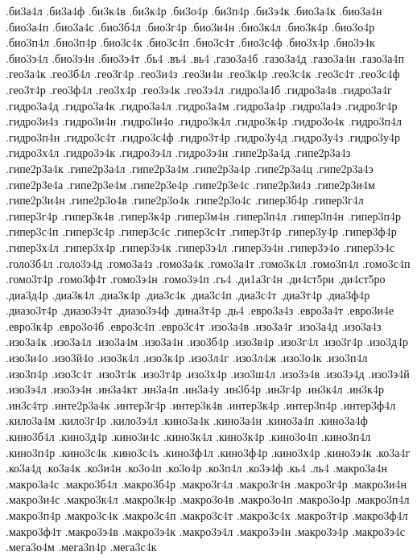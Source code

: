 {.би3а4л
.би3а4ф
.би3к4в
.би3к4р
.би3о4р
.би3п4р
.би3э4к
.био3а4к
.био3а4н
.био3а4п
.био3а4с
.био3б4л
.био3г4р
.био3и4н
.био3к4л
.био3к4р
.био3о4р
.био3п4л
.био3п4р
.био3с4к
.био3с4п
.био3с4т
.био3с4ф
.био3х4р
.био3э4к
.био3э4л
.био3э4н
.био3э4т
.бь4
.въ4
.вь4
.газо3а4б
.газо3а4д
.газо3а4н
.газо3а4п
.гео3а4к
.гео3б4л
.гео3г4р
.гео3и4з
.гео3и4н
.гео3к4р
.гео3с4к
.гео3с4т
.гео3с4ф
.гео3т4р
.гео3ф4л
.гео3х4р
.гео3э4к
.гео3э4л
.гидро3а4б
.гидро3а4в
.гидро3а4г
.гидро3а4д
.гидро3а4к
.гидро3а4л
.гидро3а4м
.гидро3а4р
.гидро3а4э
.гидро3г4р
.гидро3и4з
.гидро3и4н
.гидро3и4о
.гидро3к4л
.гидро3к4р
.гидро3о4к
.гидро3п4л
.гидро3п4н
.гидро3с4т
.гидро3с4ф
.гидро3т4р
.гидро3у4д
.гидро3у4з
.гидро3у4р
.гидро3х4л
.гидро3э4к
.гидро3э4л
.гидро3э4н
.гипе2р3а4д
.гипе2р3а4з
.гипе2р3а4к
.гипе2р3а4л
.гипе2р3а4м
.гипе2р3а4р
.гипе2р3а4ц
.гипе2р3а4э
.гипе2р3е4а
.гипе2р3е4м
.гипе2р3е4р
.гипе2р3е4с
.гипе2р3и4з
.гипе2р3и4м
.гипе2р3и4н
.гипе2р3о4в
.гипе2р3о4к
.гипе2р3о4с
.гипер3б4р
.гипер3г4л
.гипер3г4р
.гипер3к4в
.гипер3к4р
.гипер3м4н
.гипер3п4л
.гипер3п4н
.гипер3п4р
.гипер3с4п
.гипер3с4р
.гипер3с4с
.гипер3с4т
.гипер3т4р
.гипер3у4р
.гипер3ф4р
.гипер3х4л
.гипер3х4р
.гипер3э4к
.гипер3э4л
.гипер3э4н
.гипер3э4о
.гипер3э4с
.голо3б4л
.голо3э4д
.гомо3а4з
.гомо3а4к
.гомо3а4т
.гомо3к4л
.гомо3п4л
.гомо3с4п
.гомо3т4р
.гомо3ф4т
.гомо3э4н
.гомо3э4п
.гь4
.ди1а3г4н
.ди4ст5ри
.ди4ст5ро
.диа3д4р
.диа3к4л
.диа3к4р
.диа3с4к
.диа3с4п
.диа3с4т
.диа3т4р
.диа3ф4р
.диазо3т4р
.диазо3э4т
.диазо3э4ф
.дина3т4р
.дь4
.евро3а4з
.евро3а4т
.евро3и4е
.евро3к4р
.евро3о4б
.евро3с4п
.евро3с4т
.изо3а4в
.изо3а4г
.изо3а4д
.изо3а4з
.изо3а4к
.изо3а4л
.изо3а4м
.изо3а4н
.изо3б4р
.изо3в4р
.изо3г4л
.изо3г4р
.изо3д4р
.изо3и4о
.изо3й4о
.изо3к4л
.изо3к4р
.изо3л4г
.изо3л4ж
.изо3о4к
.изо3п4л
.изо3п4р
.изо3с4т
.изо3т4к
.изо3т4р
.изо3х4р
.изо3ш4л
.изо3э4в
.изо3э4д
.изо3э4й
.изо3э4л
.изо3э4н
.ин3а4кт
.ин3а4п
.ин3а4у
.ин3б4р
.ин3г4р
.ин3к4л
.ин3к4р
.ин3с4тр
.инте2р3а4к
.интер3г4р
.интер3к4в
.интер3к4р
.интер3п4р
.интер3ф4л
.кило3а4м
.кило3г4р
.кило3э4л
.кино3а4к
.кино3а4н
.кино3а4п
.кино3а4ф
.кино3б4л
.кино3д4р
.кино3и4с
.кино3к4л
.кино3к4р
.кино3о4п
.кино3п4л
.кино3п4р
.кино3с4к
.кино3с4ъ
.кино3ф4л
.кино3ф4р
.кино3х4р
.кино3э4к
.ко3а4г
.ко3а4д
.ко3а4к
.ко3и4н
.ко3о4п
.ко3о4р
.ко3п4л
.ко3э4ф
.кь4
.ль4
.макро3а4н
.макро3а4с
.макро3б4л
.макро3б4р
.макро3г4л
.макро3г4н
.макро3г4р
.макро3и4н
.макро3и4с
.макро3к4л
.макро3к4р
.макро3о4в
.макро3о4п
.макро3о4р
.макро3п4л
.макро3п4р
.макро3с4к
.макро3с4п
.макро3с4т
.макро3с4х
.макро3т4р
.макро3ф4л
.макро3ф4т
.макро3э4в
.макро3э4к
.макро3э4л
.макро3э4н
.макро3э4р
.макро3э4с
.мега3о4м
.мега3п4р
.мега3с4к
}

